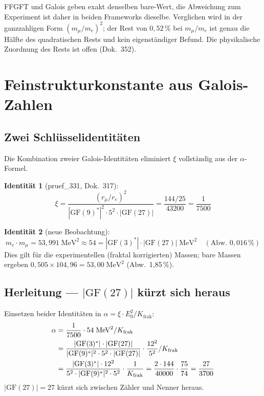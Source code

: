FFGFT und Galois geben exakt denselben bare-Wert, die Abweichung zum
Experiment ist daher in beiden Frameworks dieselbe. Verglichen wird in der
ganzzahligen Form $(m_\mu/m_e)^2$; der Rest von $0{,}52\,\%$ bei $m_\mu/m_e$
ist genau die Hälfte des quadratischen Rests und kein eigenständiger Befund.
Die physikalische Zuordnung des Rests ist offen (Dok.~352).

\section{Feinstrukturkonstante aus Galois-Zahlen}

\subsection{Zwei Schlüsselidentitäten}

Die Kombination zweier Galois-Identitäten eliminiert $\xi$ vollständig
aus der $\alpha$-Formel.

\textbf{Identität 1} (pruef\_331, Dok.~317):
\begin{equation}
  \xi = \frac{(r_\mu/r_e)^2}{|\text{GF}(9)^*|^2 \cdot 5^2 \cdot |\text{GF}(27)|}
  = \frac{144/25}{43200} = \frac{1}{7500}
\end{equation}

\textbf{Identität 2} (neue Beobachtung):
\begin{equation}
  m_e \cdot m_\mu = 53{,}991\;\text{MeV}^2
  \approx 54 = |\text{GF}(3)^*| \cdot |\text{GF}(27)| \;\text{MeV}^2
  \quad (\text{Abw. } 0{,}016\,\%)
\end{equation}
Dies gilt für die experimentellen (fraktal korrigierten) Massen;
bare Massen ergeben $0{,}505 \times 104{,}96 = 53{,}00\;\text{MeV}^2$ (Abw.\ 1{,}85\,\%).

\subsection{Herleitung — $|\text{GF}(27)|$ kürzt sich heraus}

Einsetzen beider Identitäten in $\alpha = \xi \cdot E_0^2 / K_\text{frak}$:
\begin{align}
  \alpha &= \frac{1}{7500} \cdot 54\;\text{MeV}^2 / K_\text{frak} \notag\\
         &= \frac{|\text{GF}(3)^*| \cdot |\text{GF}(27)|}
              {|\text{GF}(9)^*|^2 \cdot 5^2 \cdot |\text{GF}(27)|} \cdot
              \frac{12^2}{5^2} / K_\text{frak} \notag\\
         &= \frac{|\text{GF}(3)^*| \cdot 12^2}
              {5^2 \cdot |\text{GF}(9)^*|^2 \cdot 5^2} \cdot \frac{1}{K_\text{frak}}
         = \frac{2 \cdot 144}{40000} \cdot \frac{75}{74}
         = \frac{27}{3700}
\end{align}
$|\text{GF}(27)| = 27$ kürzt sich zwischen Zähler und Nenner heraus.

